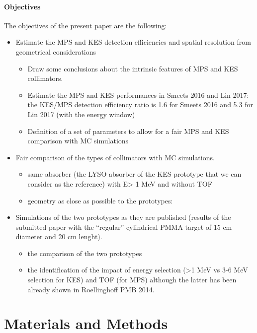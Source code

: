 \documentclass[a4paper,english]{article}
\begin{document}
\paragraph{Objectives}
The objectives of the present paper are the following:
\begin{itemize}
	\item Estimate the MPS and KES detection efficiencies and spatial resolution from geometrical considerations 
    \begin{itemize}
    	\item Draw some conclusions about the intrinsic features of MPS and KES collimators. 
        \item Estimate the MPS and KES performances in Smeets 2016 and Lin 2017: the KES/MPS detection efficiency ratio is 1.6 for Smeets 2016 and 5.3 for Lin 2017 (with the energy window)
        \item Definition of a set of parameters to allow for a fair MPS and KES comparison with MC simulations
    \end{itemize}
    \item Fair comparison of the types of collimators with MC simulations. 
    \begin{itemize}
    	\item same absorber (the LYSO absorber of the KES prototype that we can consider as the reference) with E> 1 MeV and without TOF
        \item geometry as close as possible to the prototypes: 
	\end{itemize}            
    \item Simulations of the two prototypes as they are published (results of the submitted paper with the \enquote{regular} cylindrical PMMA target of 15 cm diameter and 20 cm lenght). 
    \begin{itemize}
		\item the comparison of the two prototypes
		\item the identification of the impact of energy selection (>1 MeV vs 3-6 MeV selection for KES) and TOF (for MPS) although the latter has been already shown in Roellinghoff PMB 2014.
	\end{itemize}        
\end{itemize}



\section{Materials and Methods}
\end{document}
